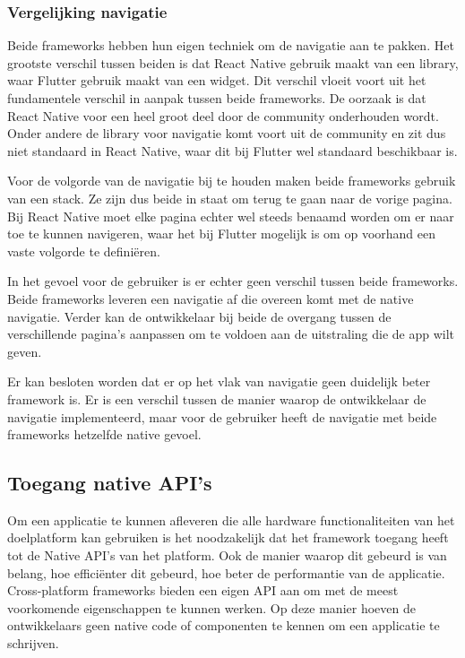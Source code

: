 \subsubsection{Vergelijking navigatie}
\label{subsubsec:vglNavigatie}

Beide frameworks hebben hun eigen techniek om de navigatie aan te pakken. Het grootste verschil tussen beiden is dat React Native gebruik maakt van een library, waar Flutter gebruik maakt van een widget. Dit verschil vloeit voort uit het fundamentele verschil in aanpak tussen beide frameworks. De oorzaak is dat React Native voor een heel groot deel door de community onderhouden wordt. Onder andere de library voor navigatie komt voort uit de community en zit dus niet standaard in React Native, waar dit bij Flutter wel standaard beschikbaar is.

Voor de volgorde van de navigatie bij te houden maken beide frameworks gebruik van een stack. Ze zijn dus beide in staat om terug te gaan naar de vorige pagina. Bij React Native moet elke pagina echter wel steeds benaamd worden om er naar toe te kunnen navigeren, waar het bij Flutter mogelijk is om op voorhand een vaste volgorde te definiëren.

In het gevoel voor de gebruiker is er echter geen verschil tussen beide frameworks. Beide frameworks leveren een navigatie af die overeen komt met de native navigatie. Verder kan de ontwikkelaar bij beide de overgang tussen de verschillende pagina's aanpassen om te voldoen aan de uitstraling die de app wilt geven. 

Er kan besloten worden dat er op het vlak van navigatie geen duidelijk beter framework is. Er is een verschil tussen de manier waarop de ontwikkelaar de navigatie implementeerd, maar voor de gebruiker heeft de navigatie met beide frameworks hetzelfde native gevoel.

\subsection{Toegang native API's}
\label{subsec:toegangNativeAPIs}

Om een applicatie te kunnen afleveren die alle hardware functionaliteiten van het doelplatform kan gebruiken is het noodzakelijk dat het framework toegang heeft tot de Native API's van het platform. Ook de manier waarop dit gebeurd is van belang, hoe efficiënter dit gebeurd, hoe beter de performantie van de applicatie. Cross-platform frameworks bieden een eigen API aan om met de meest voorkomende eigenschappen te kunnen werken. Op deze manier hoeven de ontwikkelaars geen native code of componenten te kennen om een applicatie te schrijven.

